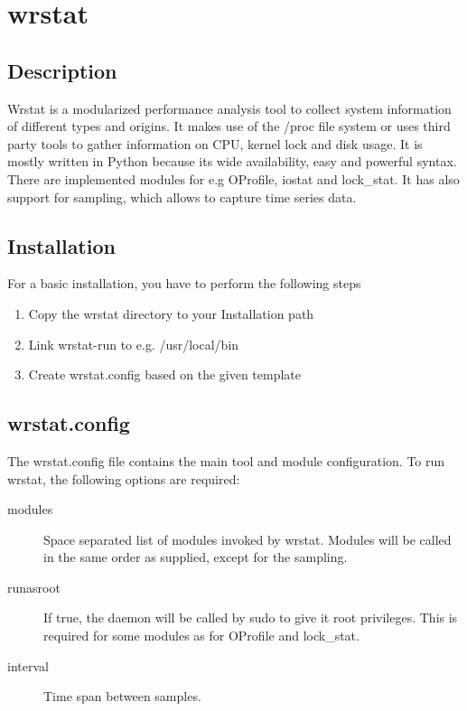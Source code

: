 \section{wrstat}

\subsection{Description}
    Wrstat is a modularized performance analysis tool to collect
    system information of different types and origins.
    It makes use of the /proc file system or uses third party tools
    to gather information on CPU, kernel lock and disk usage.
    It is mostly written in Python because its wide availability,
    easy and powerful syntax.
    There are implemented modules for e.g OProfile, iostat and lock\_stat.
    It has also support for sampling, which allows to capture time series data.

\subsection{Installation}
    For a basic installation, you have to perform the following steps
    \begin{enumerate}
        \item Copy the wrstat directory to your Installation path 
        \item Link wrstat-run to e.g. /usr/local/bin
        \item Create wrstat.config based on the given template
    \end{enumerate}

    \subsection{wrstat.config}
    The wrstat.config file contains the main tool and module configuration.
    To run wrstat, the following options are required:

    \begin{description}
        \item[modules]
            Space separated list of modules invoked by wrstat.
            Modules will be called in the same order as supplied,
            except for the sampling.
        \item[runasroot]
            If true, the daemon will be called by sudo to
            give it root privileges. This is required for some modules
            as for OProfile and lock\_stat.
        \item[interval]
            Time span between samples.
    \end{description}


